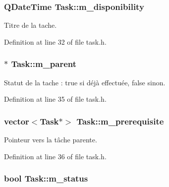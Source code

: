 \subsubsection[{m\+\_\+disponibility}]{\setlength{\rightskip}{0pt plus 5cm}Q\+Date\+Time Task\+::m\+\_\+disponibility\hspace{0.3cm}{\ttfamily [protected]}}\label{class_task_aede98e97b4be2a2b146eddb761619a6c}


Titre de la tache. 



Definition at line 32 of file task.\+h.

\hypertarget{class_task_ab7653d17e9111aab6f5664d68815e5be}{}
\subsubsection[{m\+\_\+parent}]{$\ast$ Task\+::m\+\_\+parent\hspace{0.3cm}{\ttfamily [protected]}}\label{class_task_ab7653d17e9111aab6f5664d68815e5be}


Statut de la tache \+: true si déjà effectuée, false sinon. 



Definition at line 35 of file task.\+h.

\hypertarget{class_task_a1d612002385787e4eedd460704d54ded}{}
\subsubsection[{m\+\_\+prerequisite}]{\setlength{\rightskip}{0pt plus 5cm}vector$<${\bf Task}$\ast$$>$ Task\+::m\+\_\+prerequisite\hspace{0.3cm}{\ttfamily [protected]}}\label{class_task_a1d612002385787e4eedd460704d54ded}


Pointeur vers la tâche parente. 



Definition at line 36 of file task.\+h.

\hypertarget{class_task_a1036ac363062b06e1abf7b7d6cbcb048}{}
\subsubsection[{m\+\_\+status}]{\setlength{\rightskip}{0pt plus 5cm}bool Task\+::m\+\_\+status\hspace{0.3cm}{\ttfamily [protected]}}\label{class_task_a1036ac363062b06e1abf7b7d6cbcb048}


